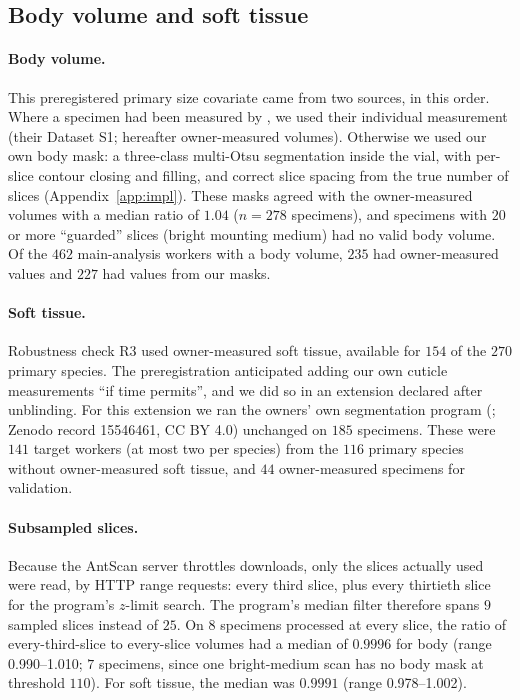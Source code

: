 \documentclass[11pt]{article}
\begin{document}
\subsection{Body volume and soft tissue}\label{sec:body}

\paragraph{Body volume.} This preregistered primary size covariate came from two sources, in this order. Where a
specimen had been measured by \citet{matte2025}, we used their individual measurement (their Dataset S1; hereafter
owner-measured volumes). Otherwise we used our own body mask: a three-class multi-Otsu segmentation inside the
vial, with per-slice contour closing and filling, and correct slice spacing from the true number of slices
(Appendix~\ref{app:impl}). These masks
agreed with the owner-measured volumes with a median ratio of $1.04$ ($n = 278$ specimens), and specimens with $20$ or
more ``guarded'' slices (bright mounting medium) had no valid body volume. Of the $462$ main-analysis workers with a
body volume, $235$ had owner-measured values and $227$ had values from our masks.

\paragraph{Soft tissue.} Robustness check R3 used owner-measured soft tissue, available for $154$ of the $270$ primary
species. The preregistration anticipated adding our own cuticle measurements ``if time permits'', and we did so in an
extension declared after unblinding. For this extension we ran the owners' own segmentation program
(\citealp{matte2025}; Zenodo record 15546461, CC BY 4.0) unchanged on $185$ specimens. These were $141$ target workers
(at most two per species) from the $116$ primary species without owner-measured soft tissue, and $44$ owner-measured
specimens for validation.

\paragraph{Subsampled slices.} Because the AntScan server throttles downloads, only the slices actually used were
read, by HTTP range requests: every third slice, plus every thirtieth slice for the program's $z$-limit search. The
program's median filter therefore spans $9$ sampled slices instead of $25$. On $8$ specimens processed at every slice,
the ratio of every-third-slice to every-slice volumes had a median of $0.9996$ for body (range 0.990--1.010; $7$
specimens, since one bright-medium scan has no body mask at threshold $110$). For soft
tissue, the median was $0.9991$ (range 0.978--1.002).
\end{document}
